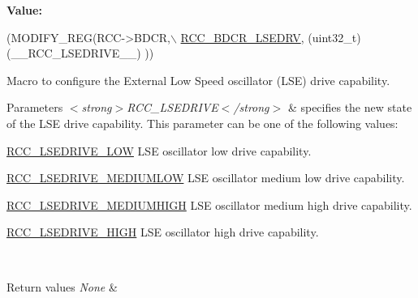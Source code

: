 {\bfseries Value\+:}
\begin{DoxyCode}
(MODIFY\_REG(RCC->BDCR,\(\backslash\)
        \hyperlink{group___peripheral___registers___bits___definition_gaa9e761cf5e09906a38e9c7e8e750514c}{RCC\_BDCR\_LSEDRV}, (uint32\_t)(\_\_RCC\_LSEDRIVE\_\_) ))
\end{DoxyCode}


Macro to configure the External Low Speed oscillator (L\+SE) drive capability. 


\begin{DoxyParams}{Parameters}
{\em $<$strong$>$\+R\+C\+C\+\_\+\+L\+S\+E\+D\+R\+I\+V\+E$<$/strong$>$} & specifies the new state of the L\+SE drive capability. This parameter can be one of the following values\+: \begin{DoxyItemize}
\item \hyperlink{group___r_c_c_ex___l_s_e_drive___configuration_gab5fa5b50304710db2d7f6d583a225da3}{R\+C\+C\+\_\+\+L\+S\+E\+D\+R\+I\+V\+E\+\_\+\+L\+OW} L\+SE oscillator low drive capability. \item \hyperlink{group___r_c_c_ex___l_s_e_drive___configuration_ga1151beb7f9869e91fe7617936ad0efff}{R\+C\+C\+\_\+\+L\+S\+E\+D\+R\+I\+V\+E\+\_\+\+M\+E\+D\+I\+U\+M\+L\+OW} L\+SE oscillator medium low drive capability. \item \hyperlink{group___r_c_c_ex___l_s_e_drive___configuration_ga295eed1e1368d526fa0f6356ceecbc48}{R\+C\+C\+\_\+\+L\+S\+E\+D\+R\+I\+V\+E\+\_\+\+M\+E\+D\+I\+U\+M\+H\+I\+GH} L\+SE oscillator medium high drive capability. \item \hyperlink{group___r_c_c_ex___l_s_e_drive___configuration_ga90b0854f3813d7ab2781519bfa58fd95}{R\+C\+C\+\_\+\+L\+S\+E\+D\+R\+I\+V\+E\+\_\+\+H\+I\+GH} L\+SE oscillator high drive capability. \end{DoxyItemize}
\\
\hline
\end{DoxyParams}

\begin{DoxyRetVals}{Return values}
{\em None} & \\
\hline
\end{DoxyRetVals}
